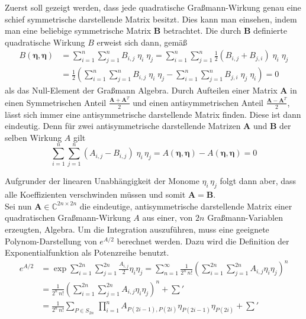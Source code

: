 \noindent Zuerst soll gezeigt werden, dass jede quadratische Graßmann-Wirkung genau eine schief symmetrische darstellende Matrix besitzt. Dies kann man einsehen, indem man eine beliebige symmetrische Matrix $\bm{B}$ betrachtet. Die durch $\bm{B}$ definierte quadratische Wirkung $B$ erweist sich dann, gemäß 
\begin{align}
B\left(\bm{\eta}, \bm{\eta}\right) 
    & = \sum_{i=1}^n \sum_{j=1}^n B_{i,j}\; \eta_i\; \eta_j = \sum_{i=1}^n \sum_{j=1}^n \frac{1}{2} (B_{i,j} + B_{j,i})\; \eta_i\; \eta_j \nonumber \\
    & =  \frac{1}{2}\left( \sum_{i=1}^n \sum_{j=1}^n B_{i,j}\; \eta_i\; \eta_j - \sum_{i=1}^n \sum_{j=1}^n B_{j,i}\; \eta_j\; \eta_i\right)  = 0 \label{eq: Symetrische Wirkung}
\end{align}
als das Null-Element der Graßmann Algebra. Durch Aufteilen einer Matrix $\bm{A}$ in einen Symmetrischen Anteil $\frac{\bm{A}+\bm{A}^T}{2}$ und einen antisymmetrischen Anteil $\frac{\bm{A}-\bm{A}^T}{2}$, lässt sich immer eine antisymmetrische darstellende Matrix finden. Diese ist dann eindeutig. Denn für zwei antisymmetrische darstellende Matrizen $\bm{A}$ und $\bm{B}$ der selben Wirkung $A$ gilt
\begin{equation} 
\sum_{i=1}^n \sum_{j=1}^n (A_{i,j} - B_{i,j})\; \eta_i\, \eta_j = A\left(\bm{\eta}, \bm{\eta}\right)  - A\left(\bm{\eta}, \bm{\eta}\right)  = 0 \nonumber
\end{equation}

\noindent Aufgrunder der linearen Unabhängigkeit der Monome $\eta_i\,\eta_j$ folgt dann aber, dass alle Koeffizienten verschwinden müssen und somit $\bm{A}=\bm{B}$. \\
\noindent Sei nun $\bm{A} \in\mathbb{C}^{2n \times 2n}$ die eindeutige, antisymmetrische darstellende Matrix einer quadratischen Graßmann-Wirkung $A$ aus einer, von $2n$  Graßmann-Variablen erzeugten, Algebra. Um die Integration auszuführen, muss eine geeignete Polynom-Darstellung von $e^{A/2}$ berechnet werden. Dazu wird die Definition der Exponentialfunktion als Potenzreihe benutzt. 
\begin{align}
e^{A/2} 
&= \exp{ \sum_{i=1}^{2n} \sum_{j=1}^{2n} \frac{A_{i,j}}{2} \eta_i \eta_j } 
= \sum_{n=1}^{\infty} \frac{1}{2^n\,n!} \left(\sum_{i=1}^{2n} \sum_{j=1}^{2n} A_{i,j} \eta_i \eta_j \right)^n  \nonumber \\
& = \frac{1}{2^n\,n!} \left(\sum_{i=1}^{2n} \sum_{j=1}^{2n} A_{i,j} \eta_i \eta_j \right)^n  + \sum ' \nonumber\\
&= \frac{1}{2^n\,n!} \sum_{P \in S_{2n}} \, \prod_{i=1}^n  A_{P(2i-1),P(2i)}\eta_{P(2i-1)}\eta_{P(2i)} + \sum ' \label{eq: exp_polynom}
\end{align}

